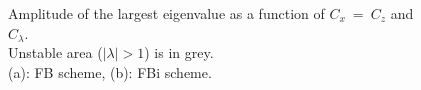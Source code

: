 \documentclass[a4paper]{article}
\numberwithin{equation}{section}
\begin{document}
\begin{figure}[!ht]
   \centering
   \quad
   \caption {Amplitude of the largest eigenvalue as a function of $C_x\ =\ C_z$ and $C_\lambda$.\\
   Unstable area ($\mid\lambda\mid >1$) is in grey.\\
   (a): FB scheme, (b): FBi scheme. }
   \label{Figstabcslambda}
\end{figure}
\end{document}
